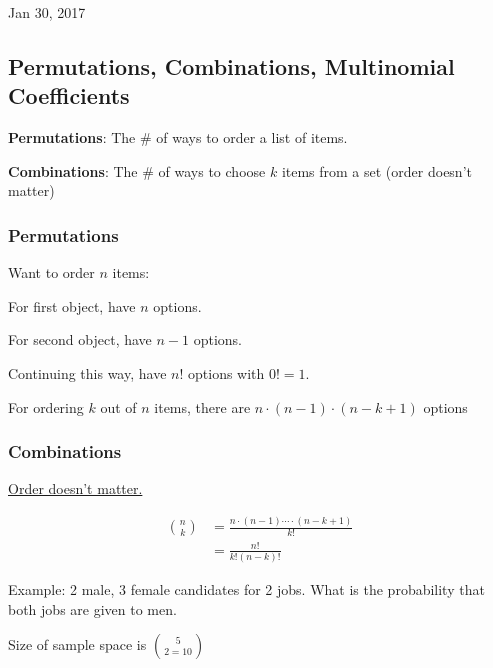 \documentclass[main.tex]{subfiles}
\begin{document}
\hrulefill{}

Jan 30, 2017

\vspace{3mm}

\subsection{Permutations, Combinations, Multinomial Coefficients}

\textbf{Permutations}: The \# of ways to order a list of items.

\textbf{Combinations}: The \# of ways to choose $k$ items from a set (order doesn't matter)

\subsubsection{Permutations}

Want to order $n$ items:

For first object, have $n$ options.

For second object, have $n - 1$ options.

Continuing this way, have $n!$ options with $0! = 1$.

For ordering $k$ out of $n$ items, there are $n \cdot (n - 1) \cdot (n - k + 1)$ options

\subsubsection{Combinations}

\underline{Order doesn't matter.}

\begin{align}
    {n \choose k} &= \frac{n\cdot (n - 1) \cdots \cdot (n - k + 1)}{k!} \\
                  &=
                  \frac{n!}{k!(n-k)!}
\end{align}

Example: 2 male, 3 female candidates for 2 jobs. What is the probability that both jobs are given to men.

Size of sample space is $5 \choose 2 = 10$
\end{document}
